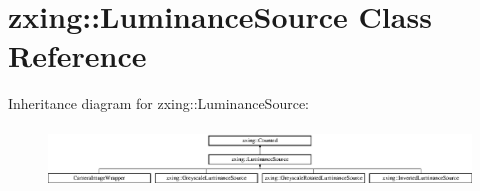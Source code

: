 \hypertarget{classzxing_1_1_luminance_source}{}\section{zxing\+:\+:Luminance\+Source Class Reference}
\label{classzxing_1_1_luminance_source}
Inheritance diagram for zxing\+:\+:Luminance\+Source\+:\begin{figure}[H]
\begin{center}
\leavevmode
\includegraphics[height=1.634241cm]{classzxing_1_1_luminance_source}
\end{center}
\end{figure}
